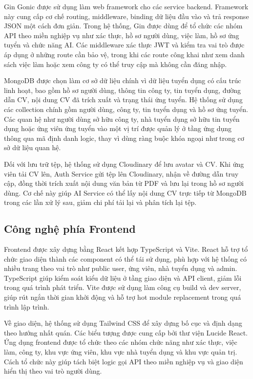 \documentclass[../DoAn.tex]{subfiles}
\begin{document}
Gin Gonic được sử dụng làm web framework cho các service backend. Framework này cung cấp cơ chế routing, middleware, binding dữ liệu đầu vào và trả response JSON một cách đơn giản. Trong hệ thống, Gin được dùng để tổ chức các nhóm API theo miền nghiệp vụ như xác thực, hồ sơ người dùng, việc làm, hồ sơ ứng tuyển và chức năng AI. Các middleware xác thực JWT và kiểm tra vai trò được áp dụng ở những route cần bảo vệ, trong khi các route công khai như xem danh sách việc làm hoặc xem công ty có thể truy cập mà không cần đăng nhập.

MongoDB được chọn làm cơ sở dữ liệu chính vì dữ liệu tuyển dụng có cấu trúc linh hoạt, bao gồm hồ sơ người dùng, thông tin công ty, tin tuyển dụng, đường dẫn CV, nội dung CV đã trích xuất và trạng thái ứng tuyển. Hệ thống sử dụng các collection chính gồm người dùng, công ty, tin tuyển dụng và hồ sơ ứng tuyển. Các quan hệ như người dùng sở hữu công ty, nhà tuyển dụng sở hữu tin tuyển dụng hoặc ứng viên ứng tuyển vào một vị trí được quản lý ở tầng ứng dụng thông qua mã định danh logic, thay vì dùng ràng buộc khóa ngoại như trong cơ sở dữ liệu quan hệ.

Đối với lưu trữ tệp, hệ thống sử dụng Cloudinary để lưu avatar và CV. Khi ứng viên tải CV lên, Auth Service gửi tệp lên Cloudinary, nhận về đường dẫn truy cập, đồng thời trích xuất nội dung văn bản từ PDF và lưu lại trong hồ sơ người dùng. Cơ chế này giúp AI Service có thể lấy nội dung CV trực tiếp từ MongoDB trong các lần xử lý sau, giảm chi phí tải lại và phân tích lại tệp.

\subsection{Công nghệ phía Frontend}
\label{subsection:2.2.2}
Frontend được xây dựng bằng React kết hợp TypeScript và Vite. React hỗ trợ tổ chức giao diện thành các component có thể tái sử dụng, phù hợp với hệ thống có nhiều trang theo vai trò như public user, ứng viên, nhà tuyển dụng và admin. TypeScript giúp kiểm soát kiểu dữ liệu ở tầng giao diện và API client, giảm lỗi trong quá trình phát triển. Vite được sử dụng làm công cụ build và dev server, giúp rút ngắn thời gian khởi động và hỗ trợ hot module replacement trong quá trình lập trình.

Về giao diện, hệ thống sử dụng Tailwind CSS để xây dựng bố cục và định dạng theo hướng nhất quán. Các biểu tượng được cung cấp bởi thư viện Lucide React. Ứng dụng frontend được tổ chức theo các nhóm chức năng như xác thực, việc làm, công ty, khu vực ứng viên, khu vực nhà tuyển dụng và khu vực quản trị. Cách tổ chức này giúp tách biệt logic gọi API theo miền nghiệp vụ và giao diện hiển thị theo vai trò người dùng.
\end{document}
